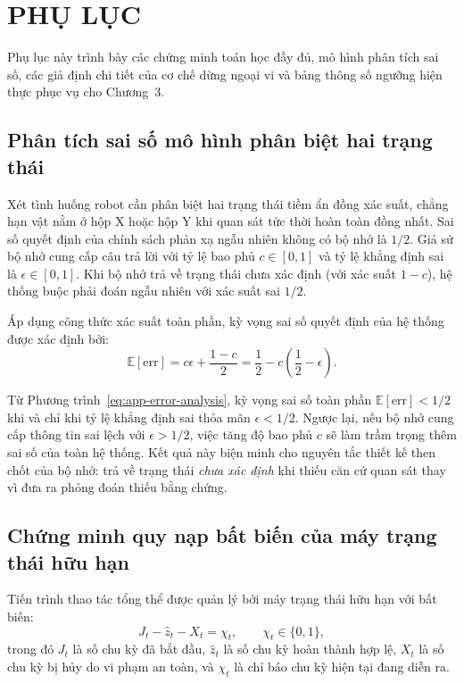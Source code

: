 \chapter{PHỤ LỤC}
\label{app:proofs}

Phụ lục này trình bày các chứng minh toán học đầy đủ, mô hình phân tích sai số, các giả định chi tiết của cơ chế dừng ngoại vi và bảng thông số ngưỡng hiện thực phục vụ cho Chương~3.

\section{Phân tích sai số mô hình phân biệt hai trạng thái}
\label{sec:app-error-analysis}

Xét tình huống robot cần phân biệt hai trạng thái tiềm ẩn đồng xác suất, chẳng hạn vật nằm ở hộp X hoặc hộp Y khi quan sát tức thời hoàn toàn đồng nhất. Sai số quyết định của chính sách phản xạ ngẫu nhiên không có bộ nhớ là $1/2$. Giả sử bộ nhớ cung cấp câu trả lời với tỷ lệ bao phủ $c \in [0, 1]$ và tỷ lệ khẳng định sai là $\epsilon \in [0, 1]$. Khi bộ nhớ trả về trạng thái chưa xác định (với xác suất $1 - c$), hệ thống buộc phải đoán ngẫu nhiên với xác suất sai $1/2$.

Áp dụng công thức xác suất toàn phần, kỳ vọng sai số quyết định của hệ thống được xác định bởi:
\begin{equation}
\mathbb E[\text{err}] = c\epsilon + \frac{1-c}{2} = \frac{1}{2} - c\left(\frac{1}{2} - \epsilon\right).
\label{eq:app-error-analysis}
\end{equation}

Từ Phương trình~\eqref{eq:app-error-analysis}, kỳ vọng sai số toàn phần $\mathbb E[\text{err}] < 1/2$ khi và chỉ khi tỷ lệ khẳng định sai thỏa mãn $\epsilon < 1/2$. Ngược lại, nếu bộ nhớ cung cấp thông tin sai lệch với $\epsilon > 1/2$, việc tăng độ bao phủ $c$ sẽ làm trầm trọng thêm sai số của toàn hệ thống. Kết quả này biện minh cho nguyên tắc thiết kế then chốt của bộ nhớ: trả về trạng thái \textit{chưa xác định} khi thiếu căn cứ quan sát thay vì đưa ra phỏng đoán thiếu bằng chứng.

\section{Chứng minh quy nạp bất biến của máy trạng thái hữu hạn}
\label{sec:app-fsm-invariant}

Tiến trình thao tác tổng thể được quản lý bởi máy trạng thái hữu hạn với bất biến:
\begin{equation}
J_t - \hat z_t - X_t = \chi_t,\qquad \chi_t \in \{0, 1\},
\label{eq:app-fsm-invariant}
\end{equation}
trong đó $J_t$ là số chu kỳ đã bắt đầu, $\hat z_t$ là số chu kỳ hoàn thành hợp lệ, $X_t$ là số chu kỳ bị hủy do vi phạm an toàn, và $\chi_t$ là chỉ báo chu kỳ hiện tại đang diễn ra.

